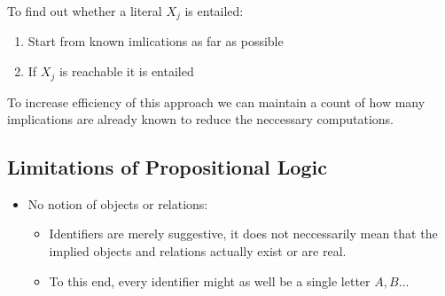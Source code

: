 \documentclass[
../../EiKI_Summary.tex,
]
{subfiles}
\begin{document}
To find out whether a literal $X_j$ is entailed:
\begin{enumerate}
    \item Start from known imlications as far as possible
    \item If $X_j$ is reachable it is entailed
\end{enumerate}

To increase efficiency of this approach we can maintain a count of how many implications are already known to reduce the neccessary computations.

\subsection{Limitations of Propositional Logic}
\begin{itemize}
    \item No notion of objects or relations: 
    \begin{itemize}
        \item Identifiers are merely suggestive, it does not neccessarily mean that the implied objects and relations actually exist or are real.
        \item To this end, every identifier might as well be a single letter $A,B\dots$
    \end{itemize}
\end{itemize}
\end{document}
